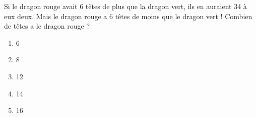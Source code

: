 Si le dragon rouge avait 6 têtes de plus que la dragon vert, ils en auraient 34 à eux deux. Mais le dragon rouge a 6 têtes de moins que le dragon vert ! Combien de têtes a le dragon rouge ?
\begin{multicols}{5}
  \begin{enumerate}[A/]
  \item 6
  \item 8
  \item 12
  \item 14
  \item 16
  \end{enumerate}
\end{multicols}